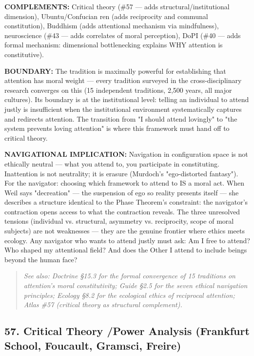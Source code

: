 \textbf{COMPLEMENTS:} Critical theory (\#57 — adds structural/\allowbreak institutional dimension), Ubuntu/\allowbreak Confucian ren (adds reciprocity and communal constitution), Buddhism (adds attentional mechanism via mindfulness), neuroscience (\#43 — adds correlates of moral perception), DoPI (\#40 — adds formal mechanism: dimensional bottlenecking explains WHY attention is constitutive).


\textbf{BOUNDARY:} The tradition is maximally powerful for establishing that attention has moral weight — every tradition surveyed in the cross-disciplinary research converges on this (15 independent traditions, 2,500 years, all major cultures). Its boundary is at the institutional level: telling an individual to attend justly is insufficient when the institutional environment systematically captures and redirects attention. The transition from "I should attend lovingly" to "the system prevents loving attention" is where this framework must hand off to critical theory.


\textbf{NAVIGATIONAL IMPLICATION:} Navigation in configuration space is not ethically neutral — what you attend to, you participate in constituting. Inattention is not neutrality; it is erasure (Murdoch's "ego-distorted fantasy"). For the navigator: choosing which framework to attend to IS a moral act. When Weil says "decreation" — the suspension of ego so reality presents itself — she describes a structure identical to the Phase Theorem's constraint: the navigator's contraction opens access to what the contraction reveals. The three unresolved tensions (individual vs. structural, asymmetry vs. reciprocity, scope of moral subjects) are not weaknesses — they are the genuine frontier where ethics meets ecology. Any navigator who wants to attend justly must ask: Am I free to attend? Who shaped my attentional field? And does the Other I attend to include beings beyond the human face?


\begin{quote}
\itshape
\textit{See also: Doctrine §15.3 for the formal convergence of 15 traditions on attention's moral constitutivity; Guide §2.5 for the seven ethical navigation principles; Ecology §8.2 for the ecological ethics of reciprocal attention; Atlas \#57 (critical theory as structural complement).}
\end{quote}


\bigskip\noindent\makebox[\textwidth]{\color{rulegray}\rule{5cm}{0.3pt}}\bigskip


\subsection*{57. Critical Theory /\allowbreak  Power Analysis (Frankfurt School, Foucault, Gramsci, Freire)}


